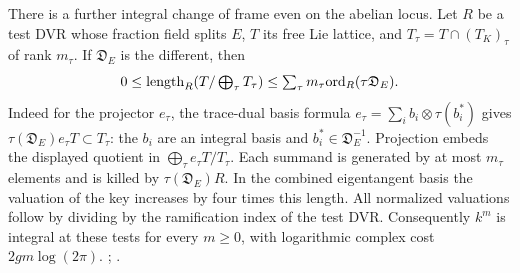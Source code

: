 There is a further integral change of frame even on the abelian
locus. Let \(R\) be a test DVR whose fraction field splits \(E\),
\(T\) its free Lie lattice, and \(T_\tau=T\cap(T_K)_\tau\) of
rank \(m_\tau\). If \(\mathfrak D_E\) is the different, then
\[
 0\le {\rm length}_R(T/\textstyle\bigoplus_\tau T_\tau)
 \le\sum_\tau m_\tau {\rm ord}_R(\tau\mathfrak D_E).
\]
Indeed for the projector \(e_\tau\), the trace-dual basis formula
\(e_\tau=\sum_i b_i\otimes\tau(b_i^*)\) gives
\(\tau(\mathfrak D_E)e_\tau T\subset T_\tau\):
the \(b_i\) are an integral basis and \(b_i^*\in\mathfrak D_E^{-1}\).
Projection embeds the displayed quotient in
\(\bigoplus_\tau e_\tau T/T_\tau\). Each summand is generated by
at most \(m_\tau\) elements and is killed by
\(\tau(\mathfrak D_E)R\). In the combined eigentangent basis
the valuation of the key increases by four times this length.
All normalized valuations follow by dividing by the ramification
index of the test DVR. Consequently \(k^m\) is integral at these
tests for every \(m\ge0\), with logarithmic complex cost
\(2gm\log(2\pi)\).
;
.

